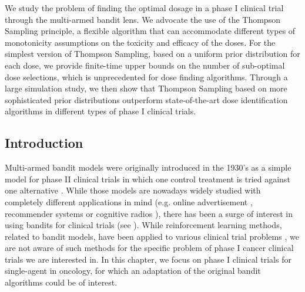 %
%
%
%
We study the problem of finding the optimal dosage in a phase I clinical trial through the multi-armed bandit lens. We advocate the use of the Thompson Sampling principle, a flexible algorithm that can accommodate different types of monotonicity assumptions on the toxicity and efficacy of the doses. For the simplest version of Thompson Sampling, based on a uniform prior distribution for each dose, we provide finite-time upper bounds on the number of sub-optimal dose selections, which is unprecedented for dose finding algorithms. Through a large simulation study, we then show that Thompson Sampling based on more sophisticated prior distributions outperform state-of-the-art dose identification algorithms in different types of phase I clinical trials.  %


%

\subsection{Introduction}

Multi-armed bandit models were originally introduced in the 1930's as a simple model for phase II clinical trials in which one control treatment is tried against one alternative \cite{Thompson33}. While those models are nowadays widely studied with completely different applications in mind (e.g. online advertisement \cite{LiChapelle11}, recommender systems \cite{LiCLS10News} or cognitive radios \cite{Anandkumar11}), there has been a surge of interest in using bandits for clinical trials (see \cite{Villar15BCT}). While reinforcement learning methods, related to bandit models, have been applied to various clinical trial problems \cite{Guez:2008:ATE:1620138.1620148, Zhao:2009:RLD:1751589, pmlr-v85-yauney18a}, we are not aware of such methods for the specific problem of phase I cancer clinical trials we are interested in.  In this chapter, we focus on phase I clinical trials for single-agent in oncology, for which an adaptation of the original bandit algorithms could be of interest.  

